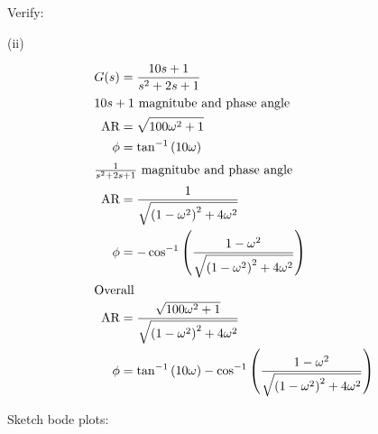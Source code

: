 \documentclass[12pt]{article}
\begin{document}
\begin{enumerate}
    Verify:

    \begin{center}
        
    \end{center}

    (ii)

    \begin{align*}
        G(s) &= \frac{10s+1}{s^2 + 2s + 1} \\
        \intertext{$10s+1$ magnitube and phase angle}
        \text{AR} &= \sqrt{100\omega^2+1} \\
        \phi &= \tan^{-1}\left(10\omega\right) \\
        \intertext{$\frac{1}{s^2 + 2s + 1}$ magnitube and phase angle}
        \text{AR} &= \frac{1}{\sqrt{\left(1-\omega^2\right)^2 + 4\omega^2}} \\
        \phi &= -\cos^{-1}\left(\frac{1-\omega^2}{\sqrt{\left(1-\omega^2\right)^2 + 4\omega^2}}\right) \\
        \intertext{Overall}
        \text{AR} &= \frac{\sqrt{100\omega^2+1}}{\sqrt{\left(1-\omega^2\right)^2 + 4\omega^2}} \\
        \phi &= \tan^{-1}\left(10\omega\right) - \cos^{-1}\left(\frac{1-\omega^2}{\sqrt{\left(1-\omega^2\right)^2 + 4\omega^2}}\right)\\
    \end{align*}

    Sketch bode plots:


\end{enumerate}
\end{document}
